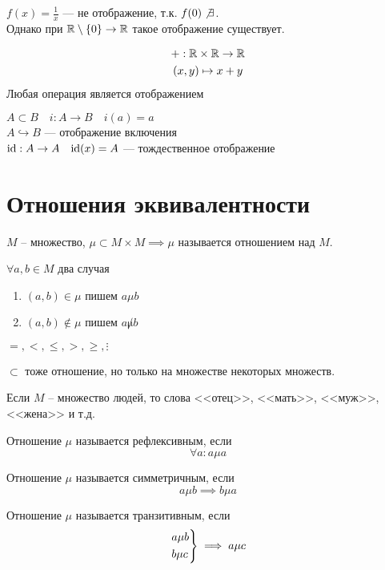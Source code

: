 \documentclass[main]{subfiles}
\begin{document}
\begin{example}
    $f(x) = \frac{1}{x}$ --- не отображение, т.к. $f(0) \not\exists$.\\
    Однако при $\mathbb{R} \setminus \{0\} \to \mathbb{R}$ такое отображение существует.
\end{example}
\begin{example}
    \begin{gather*}
        +:\mathbb{R} \times \mathbb{R}  \to \mathbb{R} \\
        (x,y)           \mapsto x+ y
    \end{gather*}
    Любая операция является отображением
\end{example}
\begin{example}
    $A \subset B \quad i:A\to B \quad i(a)=a$\\
    $ A \hookrightarrow B$ --- отображение включения\\
    $\mathrm{id}:A \to A \quad  \mathrm{id}(x)=A$ --- тождественное отображение
\end{example}


\section{Отношения эквивалентности}
\begin{definition}
    $M$ -- множество, $\mu \subset M \times M \implies \mu$ называется
    отношением над $M$.

    $\forall a,b \in M$ два случая
    \begin{enumerate}
        \item $(a,b) \in \mu$ пишем $a \mu b$
        \item $(a,b) \not\in \mu$ пишем $a \not\mu b$
    \end{enumerate}
\end{definition}
\begin{example}
    $=, <,\le , >, \ge, \vdots$

    $\subset$ тоже отношение, но только на множестве некоторых множеств.

    Если $M$ -- множество людей, то слова <<отец>>, <<мать>>, <<муж>>, <<жена>> и т.д.
\end{example}

\begin{definition}
    Отношение $\mu$ называется рефлексивным, если \[\forall a: a\mu a\]
\end{definition}
\begin{definition}
    Отношение $\mu$ называется симметричным, если \[a \mu b \implies b \mu a\]
\end{definition}
\begin{definition}
    Отношение $\mu$ называется транзитивным, если \[\begin{rcases}
            a \mu b \\
            b \mu c
        \end{rcases}\implies a\mu c\]
\end{definition}
\end{document}
